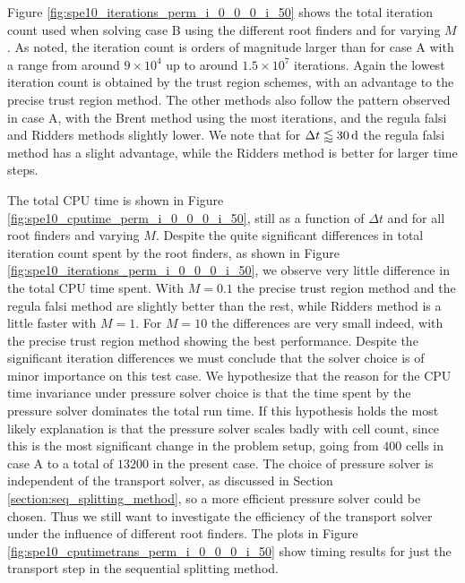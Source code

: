 

Figure \ref{fig:spe10_iterations_perm_i_0_0_0_i_50} shows the total iteration count used when solving case B using the different root finders and for varying $M$. As noted, the iteration count is orders of magnitude larger than for case A with a range from around $9\times 10^4$ up to around $1.5\times 10^7$ iterations. Again the lowest iteration count is obtained by the trust region schemes, with an advantage to the precise trust region method. The other methods also follow the pattern observed in case A, with the Brent method using the most iterations, and the regula falsi and Ridders methods slightly lower. We note that for $\Delta t \lessapprox \unit[30]{d}$ the regula falsi method has a slight advantage, while the Ridders method is better for larger time steps. 

The total CPU time is shown in Figure \ref{fig:spe10_cputime_perm_i_0_0_0_i_50}, still as a function of $\Delta t$ and for all root finders and varying $M$. Despite the quite significant differences in total iteration count spent by the root finders, as shown in Figure \ref{fig:spe10_iterations_perm_i_0_0_0_i_50}, we observe very little difference in the total CPU time spent. With $M = 0.1$ the precise trust region method and the regula falsi method are slightly better than the rest, while Ridders method is a little faster with $M = 1$. For $M = 10$ the differences are very small indeed, with the precise trust region method showing the best performance. Despite the significant iteration differences we must conclude that the solver choice is of minor importance on this test case. We hypothesize that the reason for the CPU time invariance under pressure solver choice is that the time spent by the pressure solver dominates the total run time. If this hypothesis holds the most likely explanation is that the pressure solver scales badly with cell count, since this is the most significant change in the problem setup, going from $400$ cells in case A to a total of $13200$ in the present case. The choice of pressure solver is independent of the transport solver, as discussed in Section \ref{section:seq_splitting_method}, so a more efficient pressure solver could be chosen. Thus we still want to investigate the efficiency of the transport solver under the influence of different root finders. The plots in Figure \ref{fig:spe10_cputimetrans_perm_i_0_0_0_i_50} show timing results for just the transport step in the sequential splitting method.


%


